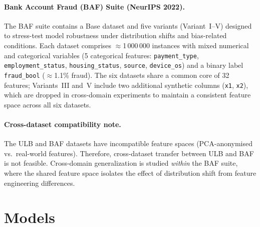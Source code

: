 \paragraph{Bank Account Fraud (BAF) Suite (NeurIPS 2022).}
The BAF suite contains a Base dataset and five variants (Variant~I--V) designed to stress-test model robustness under distribution shifts and bias-related conditions. Each dataset comprises $\approx$1\,000\,000 instances with mixed numerical and categorical variables (5 categorical features: \texttt{payment\_type}, \texttt{employment\_status}, \texttt{housing\_status}, \texttt{source}, \texttt{device\_os}) and a binary label \texttt{fraud\_bool} ($\approx$1.1\% fraud). The six datasets share a common core of 32 features; Variants~III and~V include two additional synthetic columns (\texttt{x1}, \texttt{x2}), which are dropped in cross-domain experiments to maintain a consistent feature space across all six datasets.

\paragraph{Cross-dataset compatibility note.}
The ULB and BAF datasets have incompatible feature spaces (PCA-anonymised vs.\ real-world features). Therefore, cross-dataset transfer between ULB and BAF is not feasible. Cross-domain generalization is studied \emph{within} the BAF suite, where the shared feature space isolates the effect of distribution shift from feature engineering differences.

\section{Models}
\label{sec:models}

